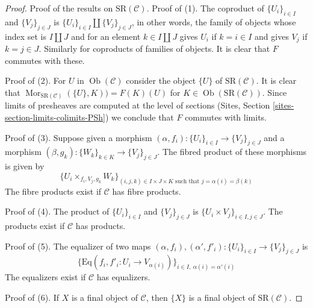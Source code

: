 \documentclass[10pt,a4paper]{amsart}
\theoremstyle{plain}
\theoremstyle{definition}
\theoremstyle{remark}
\numberwithin{equation}{subsection}
\def\Mor{\mathop{\mathrm{Mor}}\nolimits}
\def\Ob{\mathop{\mathrm{Ob}}\nolimits}
\begin{document}
\begin{proof}
Proof of the results on $\text{SR}(\mathcal{C})$.
Proof of (1). The coproduct of $\{U_i\}_{i \in I}$ and $\{V_j\}_{j \in J}$ is
$\{U_i\}_{i \in I} \amalg \{V_j\}_{j \in J}$, in other words, the family
of objects whose index set is $I \amalg J$ and for an element
$k \in I \amalg J$ gives $U_i$ if $k = i \in I$ and gives $V_j$ if
$k = j \in J$. Similarly for coproducts
of families of objects. It is clear that $F$ commutes with these.

\medskip\noindent
Proof of (2). For $U$ in $\Ob(\mathcal{C})$ consider the object $\{U\}$ of
$\text{SR}(\mathcal{C})$. It is clear that
$\Mor_{\text{SR}(\mathcal{C})}(\{U\}, K)) = F(K)(U)$
for $K \in \Ob(\text{SR}(\mathcal{C}))$. Since limits of presheaves
are computed at the level of sections
(Sites, Section \ref{sites-section-limits-colimits-PSh})
we conclude that $F$ commutes with limits.

\medskip\noindent
Proof of (3). Suppose given a morphism
$(\alpha, f_i) : \{U_i\}_{i \in I} \to \{V_j\}_{j \in J}$
and a morphism
$(\beta, g_k) : \{W_k\}_{k \in K} \to \{V_j\}_{j \in J}$.
The fibred product of these morphisms is given by
$$
\{ U_i \times_{f_i, V_j, g_k} W_k\}_{(i, j, k) \in I \times J \times K
\text{ such that } j = \alpha(i) = \beta(k)}
$$
The fibre products exist if $\mathcal{C}$ has fibre products.

\medskip\noindent
Proof of (4). The product of $\{U_i\}_{i \in I}$ and $\{V_j\}_{j \in J}$ is
$\{U_i \times V_j\}_{i \in I, j \in J}$. The products exist if
$\mathcal{C}$ has products.

\medskip\noindent
Proof of (5). The equalizer of two maps
$(\alpha, f_i), (\alpha', f'_i) : \{U_i\}_{i \in I} \to \{V_j\}_{j \in J}$
is
$$
\{
\text{Eq}(f_i, f'_i : U_i \to V_{\alpha(i)})
\}_{i \in I,\ \alpha(i) = \alpha'(i)}
$$
The equalizers exist if $\mathcal{C}$ has equalizers.

\medskip\noindent
Proof of (6). If $X$ is a final object of $\mathcal{C}$, then
$\{X\}$ is a final object of $\text{SR}(\mathcal{C})$.


\end{proof}
\end{document}
